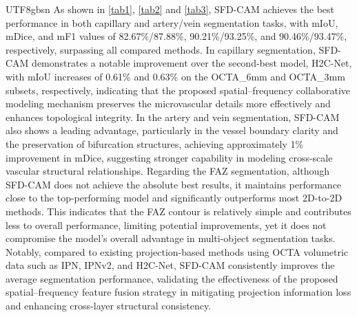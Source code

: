 \documentclass[times, review, 10pt]{elsarticle}
\begin{document}
\begin{CJK}{UTF8}{gbsn}
As shown in \autoref{tab1}, \autoref{tab2} and \autoref{tab3}, SFD-CAM achieves the best performance in both capillary and artery/vein segmentation tasks, with mIoU, mDice, and mF1 values of 82.67\%/87.88\%, 90.21\%/93.25\%, and 90.46\%/93.47\%, respectively, surpassing all compared methods. In capillary segmentation, SFD-CAM demonstrates a notable improvement over the second-best model, H2C-Net, with mIoU increases of 0.61\% and 0.63\% on the OCTA\_6mm and OCTA\_3mm subsets, respectively, indicating that the proposed spatial–frequency collaborative modeling mechanism preserves the microvascular details more effectively and enhances topological integrity. In the artery and vein segmentation, SFD-CAM also shows a leading advantage, particularly in the vessel boundary clarity and the preservation of bifurcation structures, achieving approximately 1\% improvement in mDice, suggesting stronger capability in modeling cross-scale vascular structural relationships. Regarding the FAZ segmentation, although SFD-CAM does not achieve the absolute best results, it maintains performance close to the top-performing model and significantly outperforms most 2D-to-2D methods. This indicates that the FAZ contour is relatively simple and contributes less to overall performance, limiting potential improvements, yet it does not compromise the model’s overall advantage in multi-object segmentation tasks. Notably, compared to existing projection-based methods using OCTA volumetric data such as IPN, IPNv2, and H2C-Net, SFD-CAM consistently improves the average segmentation performance, validating the effectiveness of the proposed spatial–frequency feature fusion strategy in mitigating projection information loss and enhancing cross-layer structural consistency.

\end{CJK}
\end{document}

